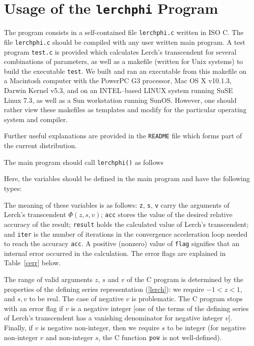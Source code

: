 \documentclass[11pt]{article}
\begin{document}
%
%
\section{Usage of the {\tt lerchphi} Program}

The program consists in a self-contained file {\tt lerchphi.c} written in 
ISO C. The file {\tt lerchphi.c} should be compiled with any user written 
main program.  A test program {\tt test.c} is provided which calculates 
Lerch's transcendent for several combinations of parameters, as well as a 
makefile (written for Unix systems) to build the executable {\tt test}. 
We built and ran an executable from this 
makefile on a Macintosh computer with the PowerPC G3 processor, 
Mac OS X v10.1.3, Darwin Kernel v5.3, and on an INTEL--based
LINUX system running SuSE Linux 7.3, as well as a Sun workstation
running SunOS. However, one should rather view these 
makefiles as templates and modify for the particular operating system and 
compiler.  

Further useful explanations are provided in the {\tt README} file
which forms part of the current distribution.

The main program should call {\tt lerchphi()} as follows
%
\begin{quote}
\end{quote}
%
Here, the variables should be defined in the main program and 
have the following types:
%
\begin{quote}
\end{quote}
%
\begin{quote}
\end{quote}
%
The meaning of these variables is as follows: {\tt z}, {\tt s}, {\tt v} carry
the arguments of Lerch's transcendent $\Phi(z,s,v)$;
{\tt acc} stores the value of
the desired relative accuracy of the result; 
{\tt result} holds the calculated
value of Lerch's transcendent; and {\tt iter} is the 
number of iterations in the
convergence acceleration loop needed to reach 
the accuracy {\tt acc}. A positive
(nonzero) value of {\tt flag} signifies that 
an internal error occurred in the
calculation. 
The error flags are explained in Table~\ref{cerr} below.

The range of valid arguments $z$, $s$ and $v$
of the C program is determined by the properties of the defining series
representation (\ref{lerch}): we require 
$-1 < z < 1$, and $s,v$ to be real. The case
of negative $v$ is problematic. The C program stops with an error flag
if $v$ is a negative integer [one of the terms of the defining series
of Lerch's transcendent 
has a vanishing denominator for negative integer $v$]. 
Finally, if $v$ is negative non-integer, then we require
$s$ to be integer (for negative non-integer $v$ and non-integer $s$,
the C function ${\tt pow}$ is not well-defined).
\end{document}
